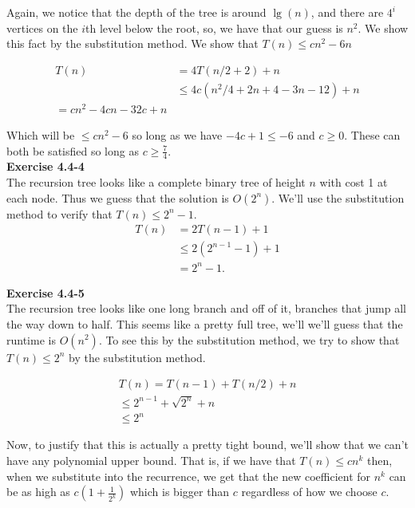 \documentclass{article}
\begin{document}
Again, we notice that the depth of the tree is around $\lg(n)$, and there are $4^i$ vertices on the $i$th level below the root, so, we have that our guess is $n^2$. We show this fact by the substitution method. We show that $T(n) \le cn^2 -6n$

\begin{align*}
T(n)  &=4T(n/2+2)+n\\
&\le4c(n^2/4 + 2n + 4 - 3n-12) + n\\
=cn^2 - 4cn-32c + n
\end{align*}

Which will be $\le cn^2-6$ so long as we have $-4c+1 \le -6$ and $c\ge0$. These can both be satisfied so long as $c\ge \frac{7}{4}$.\\

\noindent\textbf{Exercise 4.4-4}\\

The recursion tree looks like a complete binary tree of height $n$ with cost 1 at each node.  Thus we guess that the solution is $O(2^n)$.  We'll use the substitution method to verify that $T(n) \leq 2^n - 1$. 
\begin{align*}
T(n) &= 2T(n-1) + 1 \\
&\leq 2(2^{n-1} - 1) + 1 \\
&= 2^n - 1.
\end{align*}

\noindent\textbf{Exercise 4.4-5}\\

The recursion tree looks like one long branch and off of it, branches that jump all the way down to half. This seems like a pretty full tree, we'll we'll guess that the runtime is $O(n^2)$. To see this by the substitution method, we try to show that $T(n)\le 2^n$ by the substitution method.

\begin{align*}
T(n) = T(n-1) + T(n/2) + n\\
\le 2^{n-1} + \sqrt{2^{n}} + n\\
\le 2^{n}
\end{align*}

Now, to justify that this is actually a pretty tight bound, we'll show that we can't have any polynomial upper bound. That is, if we have that $T(n)\le cn^k$ then, when we substitute into the recurrence, we get that the new coefficient for $n^k$ can be as high as $c(1+\frac{1}{2^k})$ which is bigger than $c$ regardless of how we choose $c$.\\ 
\end{document}
